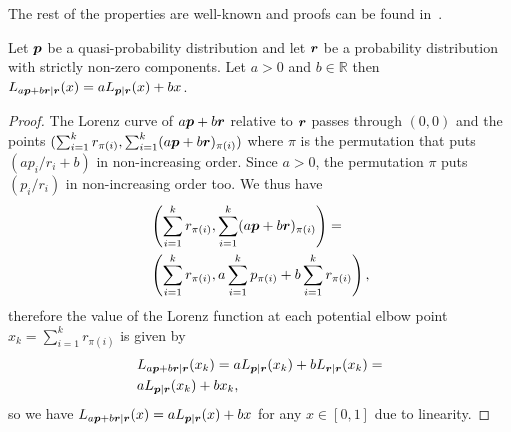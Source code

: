 	The rest of the properties are well-known and proofs can be found in~\cite{cit:marshall,cit:bhatia,cit:nielsen,cit:lostaglio}.



\begin{lemma} Let $\boldsymbol{p}$ be a quasi-probability distribution and let $\boldsymbol{r}$ be a probability distribution with strictly non-zero components. Let $a > 0$ and $b \in \mathbb{R}$ then $L_{a\boldsymbol{p} + b \boldsymbol{r} | \boldsymbol{r}} (x) = a L_{\boldsymbol{p} |\boldsymbol{r}}(x) + b x$.
\end{lemma}\label{lemma:Lorenz_linearity}
\begin{proof} The Lorenz curve of $a\boldsymbol{p} + b \boldsymbol{r}$ relative to $\boldsymbol{r}$ passes through $(0,0)$ and the points $(\sum_{i=1}^k{r_{\pi(i)}}, \sum_{i=1}^k(a \boldsymbol{p} + b \boldsymbol{r})_{\pi(i)})$ where $\pi$ is the permutation that puts $(a p_i/r_i + b)$ in non-increasing order. Since $a > 0$, the permutation $\pi$ puts  $(p_i/r_i)$ in non-increasing order too. We thus have
\begin{align*}
&\left( \sum_{i=1}^kr_{\pi(i)}, \sum_{i=1}^k(a \boldsymbol{p} + b \boldsymbol{r})_{\pi(i)} \right) = \\ 
&\left( \sum_{i=1}^k r_{\pi(i)},a \sum_{i=1}^k  p_{\pi(i)} + b\sum_{i=1}^k r_{\pi(i)} \right) \nonumber,
\end{align*}
therefore the value of the Lorenz function at each potential elbow point $x_k = \sum_{i=1} ^kr_{\pi(i)}$ is given by
\begin{align}
&L_{a \boldsymbol{p} +b \boldsymbol{r}|\boldsymbol{r}} (x_k) = a L_{\boldsymbol{p}|\boldsymbol{r}} (x_k) + b L_{\boldsymbol{r}|\boldsymbol{r}}(x_k) = \nonumber\\
&a L_{\boldsymbol{p}|\boldsymbol{r}} (x_k) + b x_k,
\end{align}
so we have $L_{a\boldsymbol{p}  + b\boldsymbol{r}|\boldsymbol{r}} (x) = a L_{\boldsymbol{p} |\boldsymbol{r}}(x) + b x$ for any $x \in [0,1]$ due to linearity.
\end{proof}

